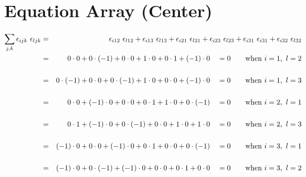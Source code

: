 \documentclass[a4paper]{article}
\begin{document}
\section{Equation Array (Center)}

\begin{comment}
\begin{eqnarray*}
	
\end{eqnarray*}
\end{comment}

\begin{eqnarray*}
	\sum_{j,k} \epsilon_{ijk} \ \epsilon_{ljk} & = & \epsilon_{i12} \ \epsilon_{l12} + \epsilon_{i13} \ \epsilon_{l13} + \epsilon_{i21} \ \epsilon_{l21} + \epsilon_{i23} \ \epsilon_{l23} + \epsilon_{i31} \ \epsilon_{i31} + \epsilon_{i32} \ \epsilon_{l32}\\
	& = & 0\cdot0 + 0\cdot(-1) + 0\cdot0 + 1\cdot0 + 0\cdot1 + (-1)\cdot0 \quad = 0 \text{\qquad when $i=1,\ l=2$} \\\\
	& = & 0\cdot(-1) + 0\cdot0 + 0\cdot(-1) + 1\cdot0 + 0\cdot0 + (-1)\cdot0 \quad = 0 \text{\qquad when $i=1, \ l=3$} \\\\
	& = & 0\cdot0 + (-1)\cdot0 + 0\cdot0 + 0\cdot1 + 1\cdot0 + 0\cdot(-1) \quad = 0 \text{\qquad when $i=2,\ l=1$} \\\\
	& = & 0\cdot1 + (-1)\cdot0 + 0\cdot(-1) + 0\cdot0 + 1\cdot0 + 1\cdot0 \quad = 0 \text{\qquad when $i=2,\ l=3$} \\\\
	& = & (-1)\cdot0 + 0\cdot0 + (-1)\cdot0 + 0\cdot1 + 0\cdot0 + 0\cdot(-1) \quad = 0 \text{\qquad when $i=3,\ l=1$} \\\\
	& = & (-1)\cdot0 + 0\cdot(-1) + (-1)\cdot0 + 0\cdot0 + 0\cdot1 + 0\cdot0 \quad = 0 \text{\qquad when $i=3,\ l=2$}
\end{eqnarray*}
\end{document}
